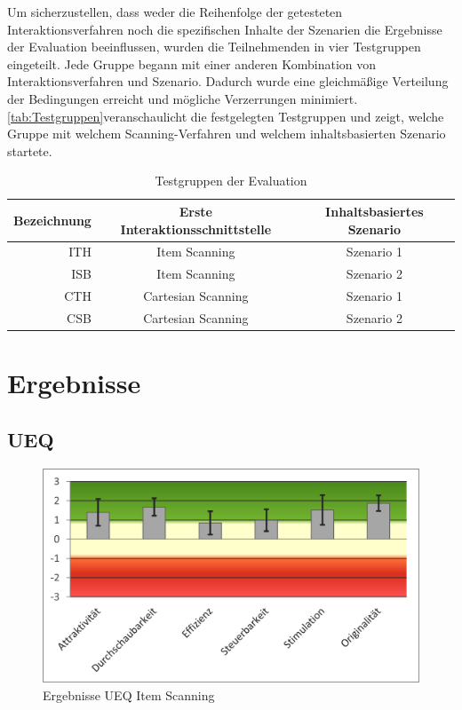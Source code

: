 Um sicherzustellen, dass weder die Reihenfolge der getesteten Interaktionsverfahren noch die spezifischen Inhalte der Szenarien die Ergebnisse der Evaluation beeinflussen, wurden die Teilnehmenden in vier Testgruppen eingeteilt. Jede Gruppe begann mit einer anderen Kombination von Interaktionsverfahren und Szenario. Dadurch wurde eine gleichmäßige Verteilung der Bedingungen erreicht und mögliche Verzerrungen minimiert. \autoref{tab:Testgruppen}veranschaulicht die festgelegten Testgruppen und zeigt, welche Gruppe mit welchem Scanning-Verfahren und welchem inhaltsbasierten Szenario startete. 

\begin{table}[ht]
 \centering
 \begin{tabular}{r|c|c}
 Bezeichnung & Erste Interaktionsschnittstelle & Inhaltsbasiertes Szenario\\
 \hline
 ITH & Item Scanning & Szenario 1\\
 ISB & Item Scanning & Szenario 2\\
 CTH & Cartesian Scanning & Szenario 1\\
 CSB & Cartesian Scanning & Szenario 2\\
 \end{tabular}
 \caption{Testgruppen der Evaluation}
 \label{tab:Testgruppen}
\end{table}

\section{Ergebnisse}

\subsection{UEQ} 

\begin{figure}[tbh]
 \centering
\includegraphics{images/Results/UEQ-Item.png}
 \caption{Ergebnisse UEQ Item Scanning}
 \label{fig:ueqScoreItem}
\end{figure}

